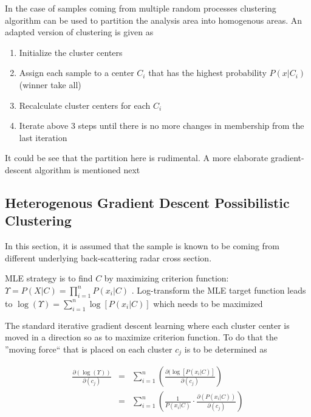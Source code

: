 \documentclass[journal]{IEEEtran}
\begin{document}
In the case of samples coming from multiple random processes clustering algorithm can be used to partition the analysis area into homogenous areas. An adapted version of clustering is given as

\begin{enumerate}
\item Initialize the cluster centers
\item Assign each sample to a center $C_i$ that has the highest probability $P(x|C_i)$ (winner take all)
\item Recalculate cluster centers for each $C_i$
\item Iterate above 3 steps until there is no more changes in membership from the last iteration
\end{enumerate}

It could be see that the partition here is rudimental. A more elaborate gradient-descent algorithm is mentioned next

\subsection{Heterogenous Gradient Descent Possibilistic Clustering}

In this section, it is assumed that the sample is known to be coming from different underlying back-scattering radar cross section. 

MLE strategy is to find $C$ by maximizing criterion function: $ \Upsilon = P(X|C) = \displaystyle \prod_{i=1}^n{P(x_i|C)}$ . Log-transform the MLE target function leads to $\log(\Upsilon)  = \displaystyle \sum_{i=1}^n{\log[P(x_i|C)]}$ which needs to be maximized

The standard iterative gradient descent learning where each cluster center is moved in a direction so as to maximize criterion function. To do that the ''moving force`` that is placed on each cluster $c_j$ is to be determined as

\begin{eqnarray}
\label{eqn:single_cluster_move_force}
\frac{\partial(\log(\Upsilon))}{\partial(c_j)} 
	&=& \displaystyle \sum_{i=1}^n { \left( \frac{\partial(\log \left[ P(x_i|C) \right] }{\partial(c_j)} \right) }  
	\nonumber \\ 
	&=& \displaystyle \sum_{i=1}^n { \left( \frac{1}{P(x_i|C) } \cdot \frac{\partial(P(x_i|C))}{\partial(c_j)} \right) }
\end{eqnarray}
\end{document}
